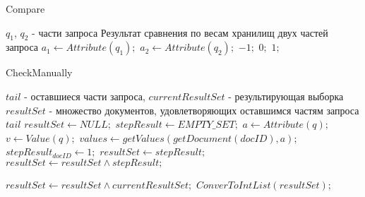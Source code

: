 \documentclass{matmex-diploma}
\begin{document}
        \begin{algorithm}[H]                   
        \caption{Compare}              
        \label{cmp}                        
            \begin{algorithmic}        
                \REQUIRE $q_1$, $q_2$ - части запроса
                \ENSURE Результат сравнения по весам хранилищ двух частей запроса
                \STATE $a_1 \leftarrow Attribute(q_1);$
                \STATE $a_2 \leftarrow Attribute(q_2);$
                    \RETURN $-1;$
                \ELSE 
                        \RETURN $0;$
                    \ELSE
                        \RETURN $1;$
                    \ENDIF
                \ENDIF
            \end{algorithmic}
        \end{algorithm}
        
        \begin{algorithm}[H]                   
        \caption{CheckManually}              
        \label{check}                        
            \begin{algorithmic}        
                \REQUIRE $tail$ - оставшиеся части запроса, $currentResultSet$ - результирующая выборка
                \ENSURE $resultSet$ - множество документов, удовлетворяющих оставшимся частям запроса $tail$
                \STATE $resultSet \leftarrow NULL;$
                    \STATE $stepResult \leftarrow EMPTY\_SET;$
                        \STATE $a \leftarrow Attribute(q);$
                        \STATE $v \leftarrow Value(q);$
                        \STATE $values \leftarrow getValues(getDocument(docID), a);$
                            \STATE $stepResult_{docID} \leftarrow 1;$
                        \ENDIF
                    \ENDFOR
                        \STATE $resultSet \leftarrow stepResult;$
                    \ENDIF
                    \STATE $resultSet \leftarrow resultSet \land stepResult;$
                    
                \ENDFOR
                \STATE $resultSet \leftarrow resultSet \land currentResultSet;$
                \RETURN $ConverToIntList(resultSet);$
            \end{algorithmic}
        \end{algorithm}
        
\end{document}
